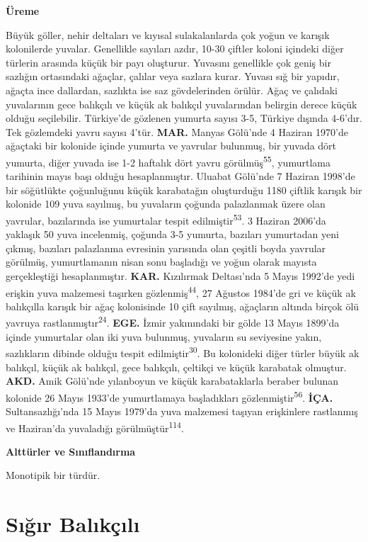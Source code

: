 \documentclass[
  letterpaper,
  DIV=11,
  numbers=noendperiod]{scrreprt}
\begin{document}
\textbf{Üreme}

Büyük göller, nehir deltaları ve kıyısal sulakalanlarda çok yoğun ve
karışık kolonilerde yuvalar. Genellikle sayıları azdır, 10-30 çiftler
koloni içindeki diğer türlerin arasında küçük bir payı oluşturur.
Yuvasını genellikle çok geniş bir sazlığın ortasındaki ağaçlar, çalılar
veya sazlara kurar. Yuvası sığ bir yapıdır, ağaçta ince dallardan,
sazlıkta ise saz gövdelerinden örülür. Ağaç ve çalıdaki yuvalarının gece
balıkçılı ve küçük ak balıkçıl yuvalarından belirgin derece küçük olduğu
seçilebilir. Türkiye'de gözlenen yumurta sayısı 3-5, Türkiye dışında
4-6'dır. Tek gözlemdeki yavru sayısı 4'tür. \textbf{MAR.} Manyas
Gölü'nde 4 Haziran 1970'de ağaçtaki bir kolonide içinde yumurta ve
yavrular bulunmuş, bir yuvada dört yumurta, diğer yuvada ise 1-2
haftalık dört yavru görülmüş\textsuperscript{55}, yumurtlama tarihinin
mayıs başı olduğu hesaplanmıştır. Uluabat Gölü'nde 7 Haziran 1998'de bir
söğütlükte çoğunluğunu küçük karabatağın oluşturduğu 1180 çiftlik
karışık bir kolonide 109 yuva sayılmış, bu yuvaların çoğunda palazlanmak
üzere olan yavrular, bazılarında ise yumurtalar tespit
edilmiştir\textsuperscript{53}. 3 Haziran 2006'da yaklaşık 50 yuva
incelenmiş, çoğunda 3-5 yumurta, bazıları yumurtadan yeni çıkmış,
bazıları palazlanma evresinin yarısında olan çeşitli boyda yavrular
görülmüş, yumurtlamanın nisan sonu başladığı ve yoğun olarak mayısta
gerçekleştiği hesaplanmıştır. \textbf{KAR.} Kızılırmak Deltası'nda 5
Mayıs 1992'de yedi erişkin yuva malzemesi taşırken
gözlenmiş\textsuperscript{44}, 27 Ağustos 1984'de gri ve küçük ak
balıkçılla karışık bir ağaç kolonisinde 10 çift sayılmış, ağaçların
altında birçok ölü yavruya rastlanmıştır\textsuperscript{24}.
\textbf{EGE.} İzmir yakınındaki bir gölde 13 Mayıs 1899'da içinde
yumurtalar olan iki yuva bulunmuş, yuvaların su seviyesine yakın,
sazlıkların dibinde olduğu tespit edilmiştir\textsuperscript{30}. Bu
kolonideki diğer türler büyük ak balıkçıl, küçük ak balıkçıl, gece
balıkçılı, çeltikçi ve küçük karabatak olmuştur. \textbf{AKD.} Amik
Gölü'nde yılanboyun ve küçük karabataklarla beraber bulunan kolonide 26
Mayıs 1933'de yumurtlamaya başladıkları
gözlenmiştir\textsuperscript{56}. \textbf{İÇA.} Sultansazlığı'nda 15
Mayıs 1979'da yuva malzemesi taşıyan erişkinlere rastlanmış ve
Haziran'da yuvaladığı görülmüştür\textsuperscript{114}.

\textbf{Alttürler ve Sınıflandırma}

Monotipik bir türdür.

\section{Sığır
Balıkçılı}\label{sux131ux11fux131r-balux131kuxe7ux131lux131}
\end{document}
